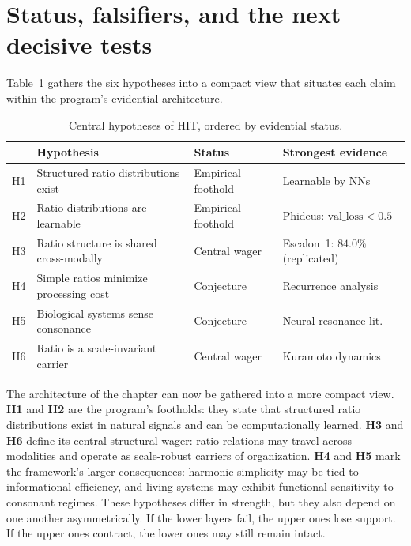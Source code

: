 \section{Status, falsifiers, and the next decisive tests}

Table~\ref{tab:hypotheses} gathers the six hypotheses into a compact view that situates each claim within the program's evidential architecture.

\begin{table}[ht]
\centering
\caption{Central hypotheses of HIT, ordered by evidential status.}
\label{tab:hypotheses}
\footnotesize
\begin{tabular}{@{}cp{4.2cm}lp{3.0cm}@{}}
\toprule
 & Hypothesis & Status & Strongest evidence \\
\midrule
H1 & Structured ratio distributions exist & Empirical foothold & Learnable by NNs \\
H2 & Ratio distributions are learnable & Empirical foothold & Phideus: $\text{val\_loss} < 0.5$ \\
H3 & Ratio structure is shared cross-modally & Central wager & Escalon~1: $84.0\%$ (replicated) \\
H4 & Simple ratios minimize processing cost & Conjecture & Recurrence analysis \\
H5 & Biological systems sense consonance & Conjecture & Neural resonance lit. \\
H6 & Ratio is a scale-invariant carrier & Central wager & Kuramoto dynamics \\
\bottomrule
\end{tabular}
\end{table}

The architecture of the chapter can now be gathered into a more compact view. \textbf{H1} and \textbf{H2} are the program's footholds: they state that structured ratio distributions exist in natural signals and can be computationally learned. \textbf{H3} and \textbf{H6} define its central structural wager: ratio relations may travel across modalities and operate as scale-robust carriers of organization. \textbf{H4} and \textbf{H5} mark the framework's larger consequences: harmonic simplicity may be tied to informational efficiency, and living systems may exhibit functional sensitivity to consonant regimes. These hypotheses differ in strength, but they also depend on one another asymmetrically. If the lower layers fail, the upper ones lose support. If the upper ones contract, the lower ones may still remain intact.

